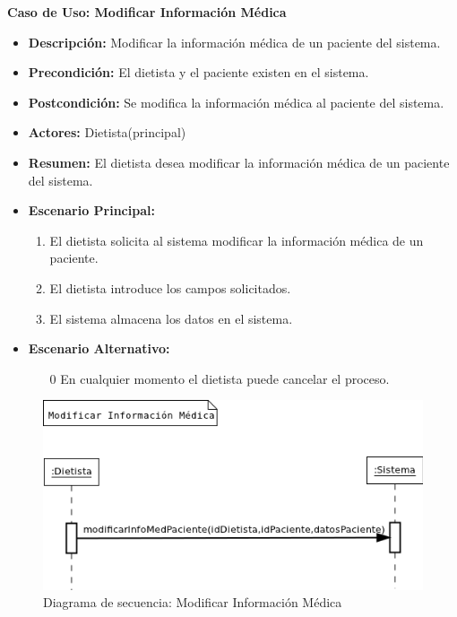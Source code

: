 \textbf{Caso de Uso: Modificar Información Médica}
\begin{itemize}
\item \textbf{Descripción:} Modificar la información médica de un paciente del sistema.
\item \textbf{Precondición:} El dietista y el paciente existen en el sistema.
\item \textbf{Postcondición:} Se modifica la información médica al paciente del sistema.
\item \textbf{Actores:} Dietista(principal)
\item \textbf{Resumen:} El dietista desea modificar la información médica de un paciente del sistema.
\item \textbf{Escenario Principal:}
\begin{enumerate}
\item El dietista solicita al sistema modificar la información médica de un paciente.
\item El dietista introduce los campos solicitados.
\item El sistema almacena los datos en el sistema.
\end{enumerate}
\item \textbf{Escenario Alternativo:}
\begin{enumerate}
\item[0] En cualquier momento el dietista puede cancelar el proceso.
\end{enumerate}
\end{itemize}
\begin{figure}[H]
  \label{ds_modificarinfomed}
  \begin{center}
    \includegraphics[scale=0.7]{../img/DS_ModificarInfoMed.png}
  \end{center}
  \caption{Diagrama de secuencia: Modificar Información Médica}
\end{figure}
